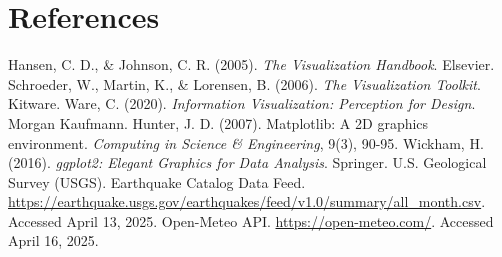 \documentclass[11pt]{article}
\begin{document}
	\section{References}
	
	\begin{thebibliography}{9}
		 Hansen, C. D., \& Johnson, C. R. (2005). \textit{The Visualization Handbook}. Elsevier.
		 Schroeder, W., Martin, K., \& Lorensen, B. (2006). \textit{The Visualization Toolkit}. Kitware.
		 Ware, C. (2020). \textit{Information Visualization: Perception for Design}. Morgan Kaufmann.
		 Hunter, J. D. (2007). Matplotlib: A 2D graphics environment. \textit{Computing in Science \& Engineering}, 9(3), 90-95.
		 Wickham, H. (2016). \textit{ggplot2: Elegant Graphics for Data Analysis}. Springer.
		U.S. Geological Survey (USGS). Earthquake Catalog Data Feed. \url{https://earthquake.usgs.gov/earthquakes/feed/v1.0/summary/all_month.csv}. Accessed April 13, 2025.
		 Open-Meteo API. \url{https://open-meteo.com/}. Accessed April 16, 2025.
		
	\end{thebibliography}
	
\end{document}
